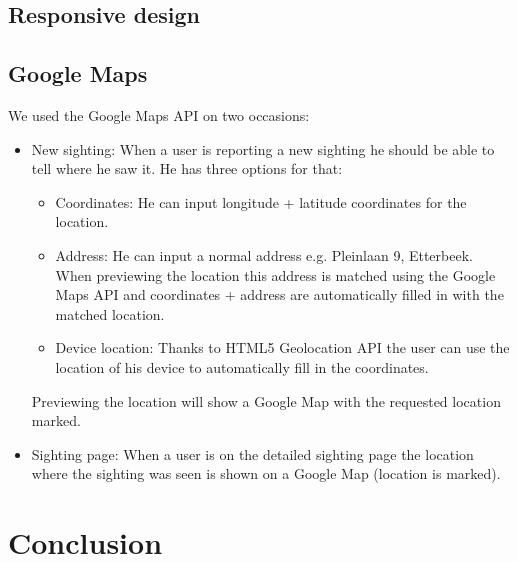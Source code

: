\documentclass{article}
\begin{document}
\subsection{Responsive design}

\subsection{Google Maps}
We used the Google Maps API on two occasions:
\begin{itemize}
\item New sighting: When a user is reporting a new sighting he should be able to tell where he saw it. He has three options for that:
\begin{itemize}
\item Coordinates: He can input longitude + latitude coordinates for the location.
\item Address: He can input a normal address e.g. Pleinlaan 9, Etterbeek. When previewing the location this address is matched using the Google Maps API and coordinates + address are automatically filled in with the matched location.
\item Device location: Thanks to HTML5 Geolocation API the user can use the location of his device to automatically fill in the coordinates.
\end{itemize}
Previewing the location will show a Google Map with the requested location marked.
\item Sighting page: When a user is on the detailed sighting page the location where the sighting was seen is shown on a Google Map (location is marked).
\end{itemize}

\section{Conclusion}
\end{document}
